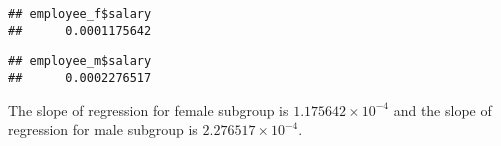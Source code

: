 \documentclass[
]{article}
\newenvironment{Shaded}{\begin{snugshade}}{\end{snugshade}}
\newcommand{\CommentTok}[1]{\textcolor[rgb]{0.56,0.35,0.01}{\textit{#1}}}
\newcommand{\DecValTok}[1]{\textcolor[rgb]{0.00,0.00,0.81}{#1}}
\newcommand{\NormalTok}[1]{#1}
\newcommand{\SpecialCharTok}[1]{\textcolor[rgb]{0.00,0.00,0.00}{#1}}
\begin{document}
\begin{verbatim}
## employee_f$salary 
##      0.0001175642
\end{verbatim}

\begin{Shaded}
\end{Shaded}

\begin{verbatim}
## employee_m$salary 
##      0.0002276517
\end{verbatim}

The slope of regression for female subgroup is
\ensuremath{1.175642\times 10^{-4}} and the slope of regression for male
subgroup is \ensuremath{2.276517\times 10^{-4}}.
\end{document}
